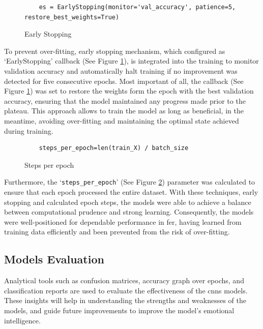 \begin{figure}[H] 
    \centering
\begin{verbatim}
    es = EarlyStopping(monitor='val_accuracy', patience=5, restore_best_weights=True)
\end{verbatim}
    \caption{Early Stopping}
    \label{fig:earlystopping}
\end{figure}
\indent To prevent over-fitting, early stopping mechanism, which configured as `EarlyStopping' callback (See Figure \ref{fig:earlystopping}), is integrated into the training to monitor validation accuracy and automatically halt training if no improvement was detected for five consecutive epochs.
Most important of all, the callback (See Figure \ref{fig:earlystopping}) was set to restore the weights form the epoch with the best validation accuracy, ensuring that the model maintained any progress made prior to the plateau.
This approach allows to train the model as long as beneficial, in the meantime, avoiding over-fitting and maintaining the optimal state achieved during training.
\begin{figure}[H] 
    \centering
\begin{verbatim}
    steps_per_epoch=len(train_X) / batch_size
\end{verbatim}
    \caption{Steps per epoch}
    \label{fig:steps_per_epoch}
\end{figure}
\indent Furthermore, the `\texttt{steps\_per\_epoch}' (See Figure \ref{fig:steps_per_epoch}) parameter was calculated to ensure that each epoch processed the entire dataset.
With these techniques, early stopping and calculated epoch steps, the models were able to achieve a balance between computational prudence and strong learning.
Consequently, the models were well-positioned for dependable performance in \gls{fer}, having learned from training data efficiently and been prevented from the risk of over-fitting. 

\subsection{Models Evaluation}
Analytical tools such as confusion matrices, accuracy graph over epochs, and classification reports are used to evaluate the effectiveness of the \gls{cnns} models. 
These insights will help in understanding the strengths and weaknesses of the models, and guide future improvements to improve the model's emotional intelligence.

